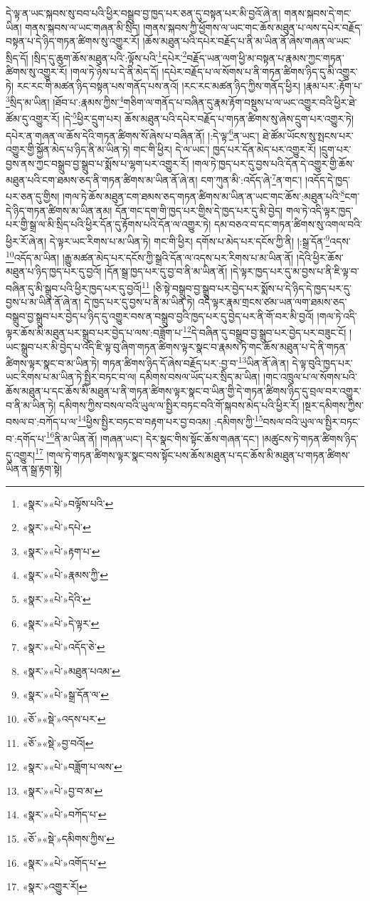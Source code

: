 དེ་ལྟ་ན་ཡང་སྐབས་སུ་བབ་པའི་ཕྱིར་བསྒྲུབ་བྱ་ཁྱད་པར་ཅན་དུ་བསྟན་པར་མི་བྱའོ་ཞེ་ན། གནས་སྐབས་དེ་གང་ཡིན། གནས་སྐབས་ལ་ཡང་གཞན་མི་སྲིད། །གནས་སྐབས་ཀྱི་ཕྱོགས་ལ་ཡང་གང་ཆོས་མཐུན་པ་ལས་དཔེར་བརྗོད་བསྟན་པ་དེ་ཉིད་གཏན་ཚིགས་སུ་འགྱུར་རོ། །ཆོས་མཐུན་པའི་དཔེར་བརྗོད་པ་ནི་མ་ཡིན་ནོ་ཞེས་གཞན་ལ་ཡང་སྲིད་དོ། །སྲིད་དུ་ཆུག་ཆོས་མཐུན་པའི་:ལྟོས་པའི་\footnote{«སྣར་»«པེ་»བལྟོས་པའི་}དཔེར་\footnote{«སྣར་»«པེ་»དཔེ་}བརྗོད་ཡན་ལག་ཕྱི་མ་བསྟན་པ་རྣམས་ཀྱང་གཏན་ཚིགས་སུ་འགྱུར་རོ། །གལ་ཏེ་ཉེས་པ་དེ་ནི་མེད་དོ། །དཔེར་བརྗོད་པ་ལ་སོགས་པ་ནི་གཏན་ཚིགས་ཉིད་དུ་མི་འགྱུར་ཏེ། རང་རང་གི་མཚན་ཉིད་བསྟན་པས་གནོད་པས་ནའོ། །རང་རང་མཚན་ཉིད་ཀྱིས་གནོད་ཕྱིར། །རྣམ་པར་:རྟོག་པ་\footnote{«སྣར་»«པེ་»རྟག་པ་}སྲིད་མ་ཡིན། །ཐོབ་པ་:རྣམས་ཀྱིས་\footnote{«སྣར་»«པེ་»རྣམས་ཀྱི་}གཅིག་ལ་གནོད་པ་བཞིན་དུ་རྣམ་རྟོག་བསྡུས་པ་ལ་ཡང་འགྱུར་བའི་ཕྱིར་ཐེ་ཚོམ་དུ་འགྱུར་རོ། །དེ་\footnote{«སྣར་»«པེ་»དེའི་}ཕྱིར་དྲུག་པར། ཆོས་མཐུན་པའི་དཔེར་བརྗོད་པ་གཏན་ཚིགས་སུ་ཞེས་དྲུག་པར་འགྱུར་ཏེ། དཔེར་ན་གཞན་ལ་ཆོས་དེའི་གཏན་ཚིགས་སོ་ཞེས་པ་བཞིན་ནོ། །:དེ་ལྟ་\footnote{«སྣར་»«པེ་»དེ་ལྟར་}ན་ཡང་། ཐེ་ཚོམ་ཡོངས་སུ་སྤངས་པར་འགྱུར་གྱི་སྐྱོན་མེད་པ་ཉིད་ནི་མ་ཡིན་ཏེ། གང་གི་ཕྱིར། དེ་ལ་ཡང་། ཁྱད་པར་དོན་མེད་པར་འགྱུར་རོ། །དྲུག་པར་བྱས་ནས་ཀྱང་བསྒྲུབ་བྱ་སྒྲུབ་པ་སྨོས་པ་ལྷག་པར་འགྱུར་རོ། །གལ་ཏེ་ཁྱད་པར་དུ་བྱས་པའི་དོན་དེ་འགྱུར་གྱི་ཆོས་མཐུན་པའི་ངག་ཐམས་ཅད་ནི་གཏན་ཚིགས་མ་ཡིན་ནོ་ཞེ་ན། ངག་ཀུན་མི་:འདོད་ཞེ་\footnote{«སྣར་»«པེ་»འདོད་ཅེ་}ན་གང་། །འདོད་དེ་ཁྱད་པར་ཅན་དུ་གྱིས། །གལ་ཏེ་ཆོས་མཐུན་ངག་ཐམས་ཅད་གཏན་ཚིགས་མ་ཡིན་ན་ཡང་གང་ཆོས་:མཐུན་པའི་\footnote{«སྣར་»«པེ་»མཐུན་པའམ་}ངག་དེ་ཉིད་གཏན་ཚིགས་མ་ཡིན་ནམ། དོན་གང་དག་གི་ཁྱད་པར་གྱིས་དེ་ཁྱད་པར་དུ་མི་བྱེད། གལ་ཏེ་འདི་ལྟར་ཁྱད་པར་གྱི་སྒྲ་ལ་མི་སྲིད་པའི་ཕྱིར་དོན་དུ་རྟོགས་པའི་དོན་ལ་འགྱུར་ཏེ། དམ་བཅའ་བ་དང་གཏན་ཚིགས་སུ་འགལ་བའི་ཕྱིར་རོ་ཞེ་ན། དེ་ལྟར་ཡང་རིགས་པ་མ་ཡིན་ཏེ། གང་གི་ཕྱིར། དགོས་པ་མེད་པར་དངོས་ཀྱི་ནི། །:སྒྲ་དོན་\footnote{«སྣར་»«པེ་»སྒྲ་དོན་ལ་}འདས་\footnote{«ཅོ་»«སྡེ་»འདས་པར་}འདོད་མ་ཡིན། །རྒྱུ་མཚན་མེད་པར་དངོས་ཀྱི་སྒྲའི་དོན་ལ་འདས་པར་རིགས་པ་མ་ཡིན་ནོ། །དེའི་ཕྱིར་ཆོས་མཐུན་པ་ཉིད་ཁྱད་པར་དུ་བྱའོ། །དོན་སྒྲ་ཁྱད་པར་དུ་བྱ་བ་ནི་མ་ཡིན་ནོ། །དེ་ལྟར་ཁྱད་པར་དུ་མ་བྱས་པ་ནི་ཇི་ལྟ་བ་བཞིན་དུ་མི་སྒྲུབ་པའི་ཕྱིར་ཁྱད་པར་དུ་བྱའོ།\footnote{«ཅོ་»«སྡེ་»བྱ་བའོ།} །ཅི་སྟེ་བསྒྲུབ་བྱ་སྒྲུབ་པར་བྱེད་པར་སྨོས་པ་དེ་ཉིད་དེ་ཁྱད་པར་དུ་བྱས་པ་མ་ཡིན་ནོ་ཞེ་ན། དེ་ཁྱད་པར་དུ་བྱས་པ་ནི་མ་ཡིན་ཏེ། འདི་ལྟར་རྣམ་གྲངས་ཙམ་ཡན་ལག་ཐམས་ཅད་བསྒྲུབ་བྱ་སྒྲུབ་པར་བྱེད་པ་ཉིད་དུ་འགྱུར་བས་ན་བསྒྲུབ་བྱའི་ཁྱད་པར་དུ་བྱེད་པར་ནི་གོ་བར་མི་བྱའོ། །གལ་ཏེ་འདི་ལྟར་ཆོས་མི་མཐུན་པར་སྒྲུབ་པར་བྱེད་པ་ལས་:བཟློག་པ་\footnote{«སྣར་»«པེ་»བཟློག་པ་ལས་}དེ་བཞིན་དུ་བསྒྲུབ་བྱ་སྒྲུབ་པར་བྱེད་པར་བཟུང་ངོ། །ཡང་སྒྲུབ་པར་མི་བྱེད་པ་འདི་ཇི་ལྟ་བུ་ཞིག་གཏན་ཚིགས་ལྟར་སྣང་བ་རྣམས་ཏེ་གང་ཆོས་མཐུན་པ་དེ་ནི་གཏན་ཚིགས་ལྟར་སྣང་བ་མ་ཡིན་ཏེ། གཏན་ཚིགས་ཉིད་དོ་ཞེས་བརྗོད་པར་:བྱ་བ་\footnote{«སྣར་»«པེ་»བྱ་བ་མ་}ཡིན་ནོ་ཞེ་ན། དེ་ལྟ་བུའི་ཁྱད་པར་ཡང་རིགས་པ་མ་ཡིན་ཏེ་སྤྱིར་བཏང་བ་ལ། དམིགས་བསལ་ཡོད་པར་སྲིད་མ་ཡིན། །གང་འཁྲུལ་པ་ལ་སོགས་པའི་ཆོས་མཐུན་པ་དང་ཆོས་མི་མཐུན་པ་ནི་གཏན་ཚིགས་ལྟར་སྣང་བ་ཡིན་གྱི་དེ་གཏན་ཚིགས་ཉིད་དུ་བྲལ་བར་འགྱུར་བ་ནི་མ་ཡིན་ཏེ། དམིགས་ཀྱིས་བསལ་བའི་ཡུལ་ལ་སྤྱིར་བཏང་བའི་གོ་སྐབས་མེད་པའི་ཕྱིར་རོ། །སྔར་དམིགས་ཀྱིས་བསལ་བ་:བཀོད་པ་ལ་\footnote{«སྣར་»«པེ་»བཀོད་པ་}ཕྱིས་སྤྱིར་བཏང་བ་བརྟག་པར་བྱ་བའམ། :དམིགས་ཀྱི་\footnote{«ཅོ་»«སྡེ་»དམིགས་ཀྱིས་}བསལ་བའི་ཡུལ་ལ་སྤྱིར་བཏང་བ་:དགོད་པ་\footnote{«སྣར་»«པེ་»འགོད་པ་}ནི་མ་ཡིན་ནོ། །གཞན་ཡང་། དེར་སྣང་གིས་སྟོང་ཆོས་གཞན་དང་། །མཚུངས་ཏེ་གཏན་ཚིགས་ཉིད་དུ་འགྱུར།\footnote{«སྣར་»འགྱུར་རོ།} །གལ་ཏེ་གཏན་ཚིགས་ལྟར་སྣང་བས་སྟོང་པས་ཆོས་མཐུན་པ་དང་ཆོས་མི་མཐུན་པ་གཏན་ཚིགས་ཡིན་ན་སྒྲ་རྟག་སྟེ། 